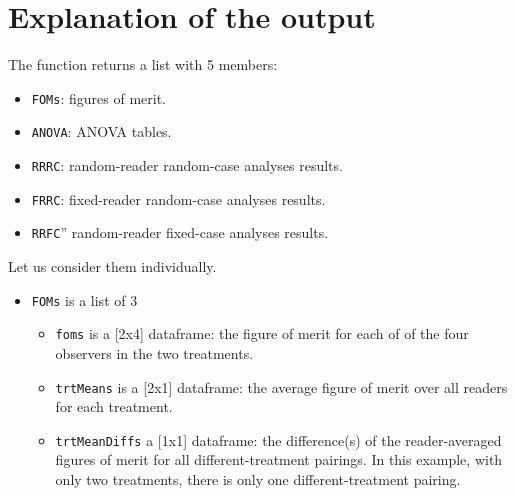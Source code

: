 \documentclass[
]{book}
\newenvironment{Shaded}{\begin{snugshade}}{\end{snugshade}}
\newcommand{\CommentTok}[1]{\textcolor[rgb]{0.56,0.35,0.01}{\textit{#1}}}
\newcommand{\FunctionTok}[1]{\textcolor[rgb]{0.00,0.00,0.00}{#1}}
\newcommand{\NormalTok}[1]{#1}
\newcommand{\SpecialCharTok}[1]{\textcolor[rgb]{0.00,0.00,0.00}{#1}}
\providecommand{\tightlist}{%
  \setlength{\itemsep}{0pt}\setlength{\parskip}{0pt}}
\begin{document}
\hypertarget{quick-start-dbm-text-explanation}{%
\section{Explanation of the output}\label{quick-start-dbm-text-explanation}}

The function returns a list with 5 members:

\begin{itemize}
\tightlist
\item
  \texttt{FOMs}: figures of merit.
\item
  \texttt{ANOVA}: ANOVA tables.
\item
  \texttt{RRRC}: random-reader random-case analyses results.
\item
  \texttt{FRRC}: fixed-reader random-case analyses results.
\item
  \texttt{RRFC}'' random-reader fixed-case analyses results.
\end{itemize}

Let us consider them individually.

\begin{Shaded}
\end{Shaded}

\begin{itemize}
\tightlist
\item
  \texttt{FOMs} is a list of 3

  \begin{itemize}
  \tightlist
  \item
    \texttt{foms} is a {[}2x4{]} dataframe: the figure of merit for each of of the four observers in the two treatments.
  \item
    \texttt{trtMeans} is a {[}2x1{]} dataframe: the average figure of merit over all readers for each treatment.
  \item
    \texttt{trtMeanDiffs} a {[}1x1{]} dataframe: the difference(s) of the reader-averaged figures of merit for all different-treatment pairings. In this example, with only two treatments, there is only one different-treatment pairing.
  \end{itemize}
\end{itemize}
\end{document}
